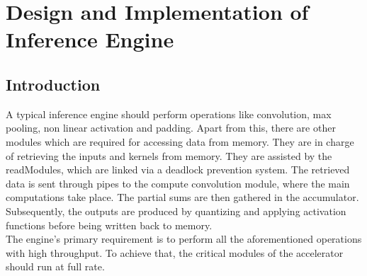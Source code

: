 
\chapter{Design and Implementation of Inference Engine}\doublespacing %

\label{Chapter3} %


\section{Introduction}
A typical inference engine should perform operations like convolution, max pooling, non linear activation and padding. Apart from this, there are other modules which are required for accessing data from memory. They are in charge of retrieving the inputs and kernels from memory. They are assisted by the readModules, which are linked via a deadlock prevention system. The retrieved data is sent through pipes to the compute convolution module, where the main computations take place. The partial sums are then gathered in the accumulator. Subsequently, the outputs are produced by quantizing and applying activation functions before being written back to memory.\\
The engine's primary requirement is to perform all the aforementioned operations with high throughput. To achieve that, the critical modules of the accelerator should run at full rate.

